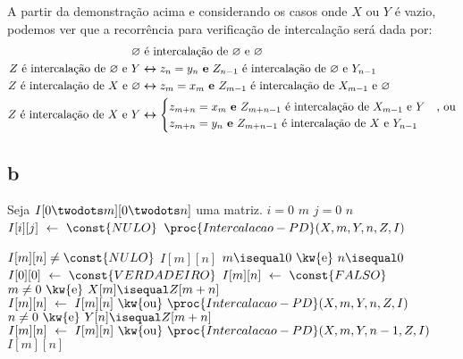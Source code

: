\itemdsep
\newpage

A partir da demonstração acima e considerando os casos onde $X$ ou $Y$ é vazio, podemos ver que a recorrência para verificação de intercalação será dada por:
\begin{align*}
    \varnothing &\text{ é intercalação de } \varnothing \text{ e } \varnothing \\
    Z \text{ é intercalação de } \varnothing \text{ e } Y &\bm{\leftrightarrow} z_n = y_n \text{ \textbf{e} } Z_{n - 1} \text{ é intercalação de } \varnothing \text{ e } Y_{n - 1} \\
    Z \text{ é intercalação de } X \text{ e } \varnothing &\bm{\leftrightarrow} z_m = x_m \text{ \textbf{e} } Z_{m - 1} \text{ é intercalação de } X_{m - 1} \text{ e } \varnothing \\
    Z \text{ é intercalação de } X \text{ e } Y &\bm{\leftrightarrow} \begin{cases}
        z_{m + n} = x_m \text{ \textbf{e} } Z_{m + n - 1} \text{ é intercalação de } X_{m - 1} \text{ e } Y &\text{, ou} \\
        z_{m + n} = y_n \text{ \textbf{e} } Z_{m + n - 1} \text{ é intercalação de } X \text{ e } Y_{n - 1}
    \end{cases}
\end{align*}

\subsection{b}

\def\And{\mbox{ \kw{e} }}
\def\Or{\mbox{ \kw{ou} }}

\begin{codebox}
    \li Seja $I[0 \twodots m][0 \twodots n]$ uma matriz.
    \li
    \li {} $i = 0$  $m$
        \Do
    \li     {} $j = 0$  $n$
            \Do
    \li         $I[i][j] \gets \const{NULO}$
            \End
        \End
    \li
    \li {} $\proc{Intercalacao-PD}(X, m, Y, n, Z, I)$
\end{codebox}

\begin{codebox}
    \li {} $I[m][n] \ne \const{NULO}$
        \Then
    \li     {} $I[m][n]$
        \End
    \li
    \li {} $m \isequal 0 \And n \isequal 0$
        \Then
    \li     $I[0][0] \gets \const{VERDADEIRO}$
        \End
    \li {}
        \Then
    \li     $I[m][n] \gets \const{FALSO}$
    \li     {} $m \ne 0 \And X[m] \isequal Z[m + n]$
            \Then
    \li         $I[m][n] \gets I[m][n] \Or \proc{Intercalacao-PD}(X, m, Y, n, Z, I)$
            \End
    \li     {} $n \ne 0 \And Y[n] \isequal Z[m + n]$
            \Then
    \li         $I[m][n] \gets I[m][n] \Or \proc{Intercalacao-PD}(X, m, Y, n-1, Z, I)$
            \End
        \End
    \li
    \li {} $I[m][n]$
\end{codebox}
